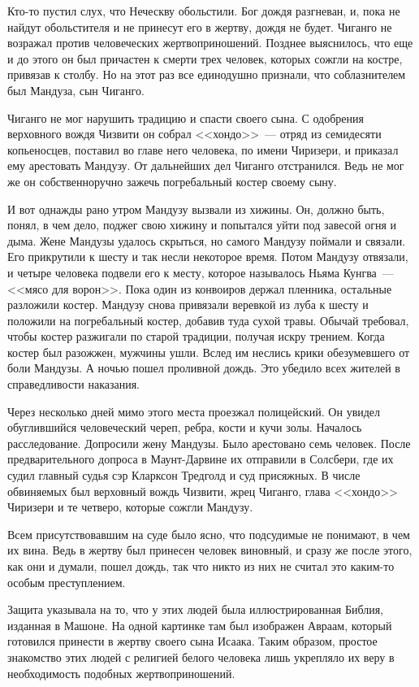 \documentclass[12pt,a4paper,twoside,openany,svgnames]{memoir}
\begin{document}
Кто-то пустил слух, что Неческву обольстили. Бог дождя разгневан, и, пока не найдут обольстителя и не принесут его в жертву, дождя не будет. Чиганго не возражал против человеческих жертвоприношений. Позднее выяснилось, что еще и до этого он был причастен к смерти трех человек, которых сожгли на костре, привязав к столбу. Но на этот раз все единодушно признали, что соблазнителем был Мандуза, сын Чиганго.

Чиганго не мог нарушить традицию и спасти своего сына. С одобрения верховного вождя Чизвити он собрал <<хондо>>~--- отряд из семидесяти копьеносцев, поставил во главе него человека, по имени Чиризери, и приказал ему арестовать Мандузу. От дальнейших дел Чиганго отстранился. Ведь не мог же он собственноручно зажечь погребальный костер своему сыну.

И вот однажды рано утром Мандузу вызвали из хижины. Он, должно быть, понял, в чем дело, поджег свою хижину и попытался уйти под завесой огня и дыма. Жене Мандузы удалось скрыться, но самого Мандузу поймали и связали. Его прикрутили к шесту и так несли некоторое время. Потом Мандузу отвязали, и четыре человека подвели его к месту, которое называлось Ньяма Кунгва~--- <<мясо для ворон>>. Пока один из конвоиров держал пленника, остальные разложили костер. Мандузу снова привязали веревкой из луба к шесту и положили на погребальный костер, добавив туда сухой травы. Обычай требовал, чтобы костер разжигали по старой традиции, получая искру трением. Когда костер был разожжен, мужчины ушли. Вслед им неслись крики обезумевшего от боли Мандузы. А ночью пошел проливной дождь. Это убедило всех жителей в справедливости наказания.

Через несколько дней мимо этого места проезжал полицейский. Он увидел обуглившийся человеческий череп, ребра, кости и кучи золы. Началось расследование. Допросили жену Мандузы. Было арестовано семь человек. После предварительного допроса в Маунт-Дарвине их отправили в Солсбери, где их судил главный судья сэр Кларксон Тредголд и суд присяжных. В числе обвиняемых был верховный вождь Чизвити, жрец Чиганго, глава <<хондо>> Чиризери и те четверо, которые сожгли Мандузу.

Всем присутствовавшим на суде было ясно, что подсудимые не понимают, в чем их вина. Ведь в жертву был принесен человек виновный, и сразу же после этого, как они и думали, пошел дождь, так что никто из них не считал это каким-то особым преступлением.

Защита указывала на то, что у этих людей была иллюстрированная Библия, изданная в Машоне. На одной картинке там был изображен Авраам, который готовился принести в жертву своего сына Исаака. Таким образом, простое знакомство этих людей с религией белого человека лишь укрепляло их веру в необходимость подобных жертвоприношений.
\end{document}

